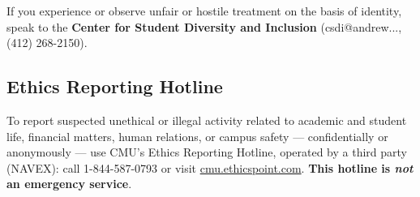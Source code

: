 If you experience or observe unfair or hostile treatment on the basis of identity,  speak to 
the \textbf{Center for Student Diversity and Inclusion} (csdi@andrew..., (412) 268-2150).
 
\subsection{Ethics Reporting Hotline}
To report suspected unethical or illegal activity related to academic and student life, financial matters, 
human relations, or campus safety --- confidentially or anonymously --- use CMU's Ethics Reporting Hotline, 
operated by a third party (NAVEX): call 1-844-587-0793 or visit \url{cmu.ethicspoint.com}. 
\textbf{This hotline is \emph{not} an emergency service}.%